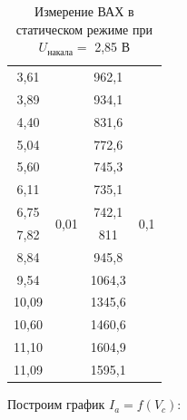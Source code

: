 \documentclass[a4paper,12pt]{report}
\begin{document}
\begin{table}[H]
\begin{tabular}{|c|c|c|c|}
3,61  & \multirow{14}{*}{0,01} & 962,1           & \multirow{14}{*}{0,1}  \\ \cline{1-1} \cline{3-3}
3,89  &                        & 934,1           &                        \\ \cline{1-1} \cline{3-3}
4,40  &                        & 831,6           &                        \\ \cline{1-1} \cline{3-3}
5,04  &                        & 772,6           &                        \\ \cline{1-1} \cline{3-3}
5,60  &                        & 745,3           &                        \\ \cline{1-1} \cline{3-3}
6,11  &                        & 735,1           &                        \\ \cline{1-1} \cline{3-3}
6,75  &                        & 742,1           &                        \\ \cline{1-1} \cline{3-3}
7,82  &                        & 811             &                        \\ \cline{1-1} \cline{3-3}
8,84  &                        & 945,8           &                        \\ \cline{1-1} \cline{3-3}
9,54  &                        & 1064,3          &                        \\ \cline{1-1} \cline{3-3}
10,09 &                        & 1345,6          &                        \\ \cline{1-1} \cline{3-3}
10,60 &                        & 1460,6          &                        \\ \cline{1-1} \cline{3-3}
11,10 &                        & 1604,9          &                        \\ \cline{1-1} \cline{3-3}
11,09 &                        & 1595,1          &                        \\ \hline
\end{tabular}
\caption{Измерение ВАХ в статическом режиме при $U_{\text{накала}}=$ 2,85 В}
\end{table}

Построим график $I_{a} = f(V_{c})$:
\end{document}
